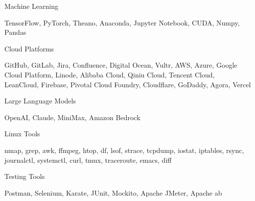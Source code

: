 \begin{cventries}
  \cventry
    {Machine Learning} %
    {} %
    {} %
    {} %
    {
      \begin{cvitems}
        \item {TensorFlow, PyTorch, Theano, Anaconda, Jupyter Notebook, CUDA, Numpy, Pandas}
      \end{cvitems}
    }

  \cventry
    {Cloud Platforms} %
    {} %
    {} %
    {} %
    {
      \begin{cvitems}
        \item {GitHub, GitLab, Jira, Confluence, Digital Ocean, Vultr, AWS, Azure, Google Cloud Platform, Linode, Alibaba Cloud, Qiniu Cloud, Tencent Cloud, LeanCloud, Firebase, Pivotal Cloud Foundry, Cloudflare, GoDaddy, Agora, Vercel}
      \end{cvitems}
    }

  \cventry
    {Large Language Models} %
    {} %
    {} %
    {} %
    {
      \begin{cvitems}
        \item {OpenAI, Claude, MiniMax, Amazon Bedrock}
      \end{cvitems}
    }

  \cventry
    {Linux Tools} %
    {} %
    {} %
    {} %
    {
      \begin{cvitems}
        \item {nmap, grep, awk, ffmpeg, htop, df, lsof, strace, tcpdump, iostat, iptables, rsync, journalctl, systemctl, curl, tmux, traceroute, emacs, diff}
      \end{cvitems}
    }

  \cventry
    {Testing Tools} %
    {} %
    {} %
    {} %
    {
      \begin{cvitems}
        \item {Postman, Selenium, Karate, JUnit, Mockito, Apache JMeter, Apache ab}
      \end{cvitems}
    }

\end{cventries}
